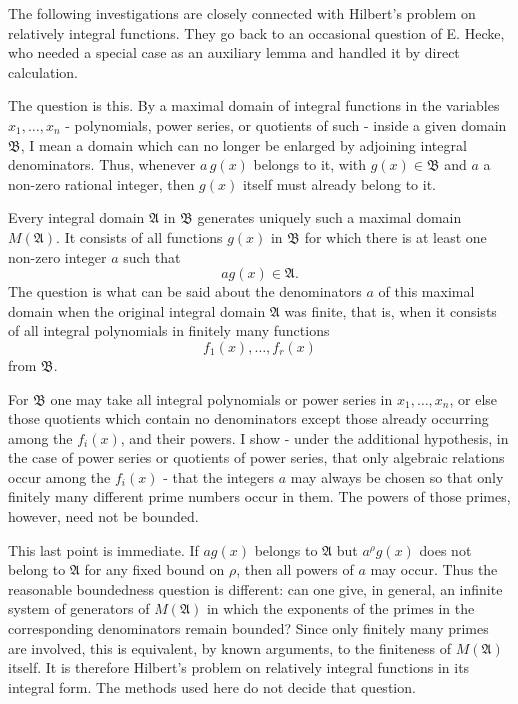 \documentclass[11pt]{article}
\begin{document}
The following investigations are closely connected with Hilbert's
problem on relatively integral functions. They go back to an occasional
question of E. Hecke, who needed a special case as an auxiliary lemma
and handled it by direct calculation.

The question is this. By a maximal domain of integral functions in the
variables \(x_1,\ldots,x_n\) - polynomials, power series, or quotients
of such - inside a given domain \(\mathfrak B\), I mean a domain which
can no longer be enlarged by adjoining integral denominators. Thus,
whenever \(a\,g(x)\) belongs to it, with \(g(x)\in\mathfrak B\) and
\(a\) a non-zero rational integer, then \(g(x)\) itself must already
belong to it.

Every integral domain \(\mathfrak A\) in \(\mathfrak B\) generates
uniquely such a maximal domain \(M(\mathfrak A)\). It consists of all
functions \(g(x)\) in \(\mathfrak B\) for which there is at least one
non-zero integer \(a\) such that \[
  a g(x)\in\mathfrak A.
\] The question is what can be said about the denominators \(a\) of this
maximal domain when the original integral domain \(\mathfrak A\) was
finite, that is, when it consists of all integral polynomials in
finitely many functions \[
  f_1(x),\ldots,f_r(x)
\] from \(\mathfrak B\).

For \(\mathfrak B\) one may take all integral polynomials or power
series in \(x_1,\ldots,x_n\), or else those quotients which contain no
denominators except those already occurring among the \(f_i(x)\), and
their powers. I show - under the additional hypothesis, in the case of
power series or quotients of power series, that only algebraic relations
occur among the \(f_i(x)\) - that the integers \(a\) may always be
chosen so that only finitely many different prime numbers occur in them.
The powers of those primes, however, need not be bounded.

This last point is immediate. If \(a g(x)\) belongs to \(\mathfrak A\)
but \(a^\rho g(x)\) does not belong to \(\mathfrak A\) for any fixed
bound on \(\rho\), then all powers of \(a\) may occur. Thus the
reasonable boundedness question is different: can one give, in general,
an infinite system of generators of \(M(\mathfrak A)\) in which the
exponents of the primes in the corresponding denominators remain
bounded? Since only finitely many primes are involved, this is
equivalent, by known arguments, to the finiteness of \(M(\mathfrak A)\)
itself. It is therefore Hilbert's problem on relatively integral
functions in its integral form. The methods used here do not decide that
question.
\end{document}

